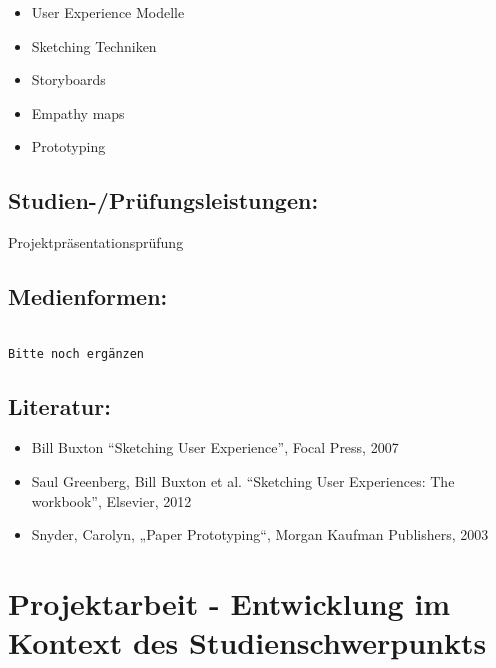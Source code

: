 \begin{itemize}
\item
  User Experience Modelle
\item
  Sketching Techniken
\item
  Storyboards
\item
  Empathy maps
\item
  Prototyping
\end{itemize}

\section*{Studien-/Prüfungsleistungen:}\label{studien-pruxfcfungsleistungen-7}

Projektpräsentationsprüfung

\section*{Medienformen:}\label{medienformen-7}

\begin{verbatim}

Bitte noch ergänzen
\end{verbatim}

\section*{Literatur:}\label{literatur-7}

\begin{itemize}
\item
  Bill Buxton ``Sketching User Experience'', Focal Press, 2007
\item
  Saul Greenberg, Bill Buxton et al. ``Sketching User Experiences: The
  workbook'', Elsevier, 2012
\item
  Snyder, Carolyn, „Paper Prototyping``, Morgan Kaufman Publishers, 2003
\end{itemize}

\chapter{Projektarbeit - Entwicklung im Kontext des
Studienschwerpunkts}\label{projektarbeit---entwicklung-im-kontext-des-studienschwerpunkts}

